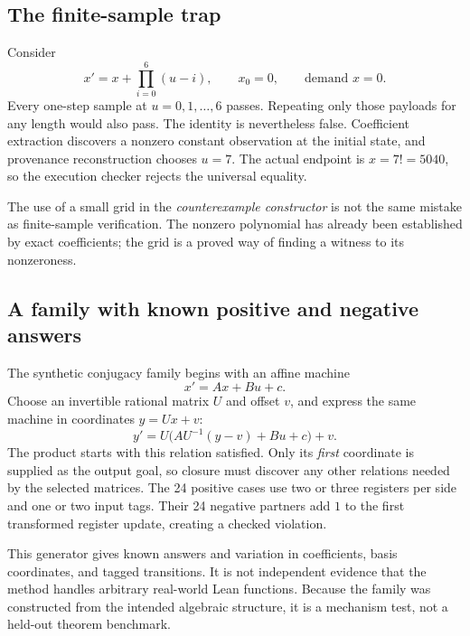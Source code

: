 \subsection{The finite-sample trap}
Consider
\[
 x'=x+\prod_{i=0}^{6}(u-i),\qquad x_0=0,
 \qquad\text{demand }x=0.
\]
Every one-step sample at $u=0,1,\ldots,6$ passes. Repeating only those payloads
for any length would also pass. The identity is nevertheless false.
Coefficient extraction discovers a nonzero constant observation at the initial
state, and provenance reconstruction chooses $u=7$. The actual endpoint is
$x=7!=5040$, so the execution checker rejects the universal equality.

The use of a small grid in the \emph{counterexample constructor} is not the
same mistake as finite-sample verification. The nonzero polynomial has already
been established by exact coefficients; the grid is a proved way of finding a
witness to its nonzeroness.

\subsection{A family with known positive and negative answers}
The synthetic conjugacy family begins with an affine machine
\[
 x'=Ax+Bu+c.
\]
Choose an invertible rational matrix $U$ and offset $v$, and express the same
machine in coordinates $y=Ux+v$:
\[
 y'=U\bigl(AU^{-1}(y-v)+Bu+c\bigr)+v.
\]
The product starts with this relation satisfied. Only its \emph{first}
coordinate is supplied as the output goal, so closure must discover any other
relations needed by the selected matrices. The 24 positive cases use two or
three registers per side and one or two input tags. Their 24 negative partners
add $1$ to the first transformed register update, creating a checked violation.

This generator gives known answers and variation in coefficients, basis
coordinates, and tagged transitions. It is not independent evidence that the
method handles arbitrary real-world Lean functions. Because the family was
constructed from the intended algebraic structure, it is a mechanism test,
not a held-out theorem benchmark.
